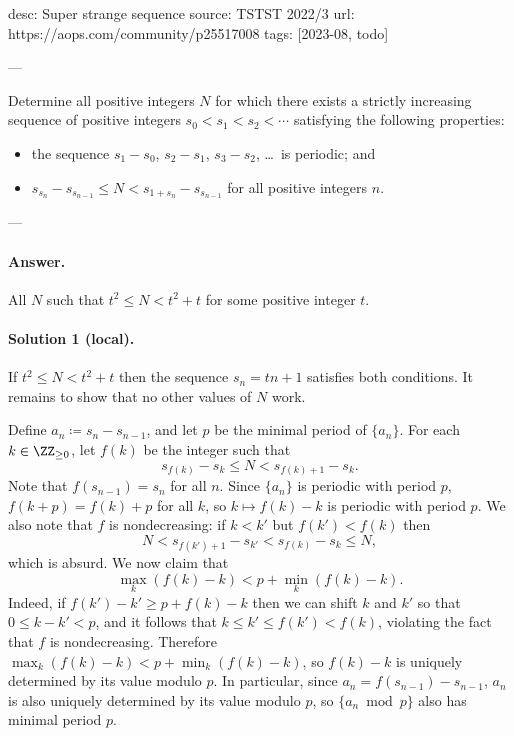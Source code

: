 desc: Super strange sequence
source: TSTST 2022/3
url: https://aops.com/community/p25517008
tags: [2023-08, todo]

---

Determine all positive integers $N$ for which there exists a strictly
increasing sequence of positive integers $s_0 < s_1 < s_2 < \dotsb$
satisfying the following properties:
\begin{itemize}
  \item the sequence $s_1-s_0$, $s_2-s_1$, $s_3-s_2$, \dots\ is periodic; and
  \item $s_{s_n} - s_{s_{n-1}} \le N < s_{1+s_n} - s_{s_{n-1}}$ for all
    positive integers $n$.
\end{itemize}

---

\paragraph{Answer.}
All $N$ such that $t^2 \le N < t^2+t$ for some positive integer $t$.

\paragraph{Solution 1 (local).}
If $t^2\le N < t^2+t$ then the sequence $s_n = tn+1$
satisfies both conditions.
It remains to show that no other values of $N$ work.

Define $a_n \coloneqq s_n - s_{n-1}$,
and let $p$ be the minimal period of $\{a_n\}$.
For each $k \in \ZZ_{\ge0}$,
let $f(k)$ be the integer such that
\[ s_{f(k)} - s_k \le N < s_{f(k)+1} - s_k. \]
Note that $f(s_{n-1}) = s_{n}$ for all $n$.
Since $\{a_n\}$ is periodic with period $p$, $f(k+p) = f(k) + p$ for all $k$,
so $k\mapsto f(k)-k$ is periodic with period $p$.
We also note that $f$ is nondecreasing:
if $k < k'$ but $f(k') < f(k)$ then
\[ N < s_{f(k')+1} - s_{k'} < s_{f(k)} - s_k \le N, \]
which is absurd.
We now claim that
\[ \max_{k} (f(k)-k) < p + \min_{k} (f(k)-k). \]
Indeed, if $f(k') - k' \ge p + f(k) - k$
then we can shift $k$ and $k'$ so that $0 \le k-k' < p$,
and it follows that $k \le k' \le f(k') < f(k)$,
violating the fact that $f$ is nondecreasing.
Therefore $\max_{k} (f(k)-k) < p + \min_{k} (f(k)-k)$,
so $f(k)-k$ is uniquely determined by its value modulo $p$.
In particular, since $a_n = f(s_{n-1}) - s_{n-1}$,
$a_n$ is also uniquely determined by its value modulo $p$,
so $\{a_n\bmod p\}$ also has minimal period $p$.

